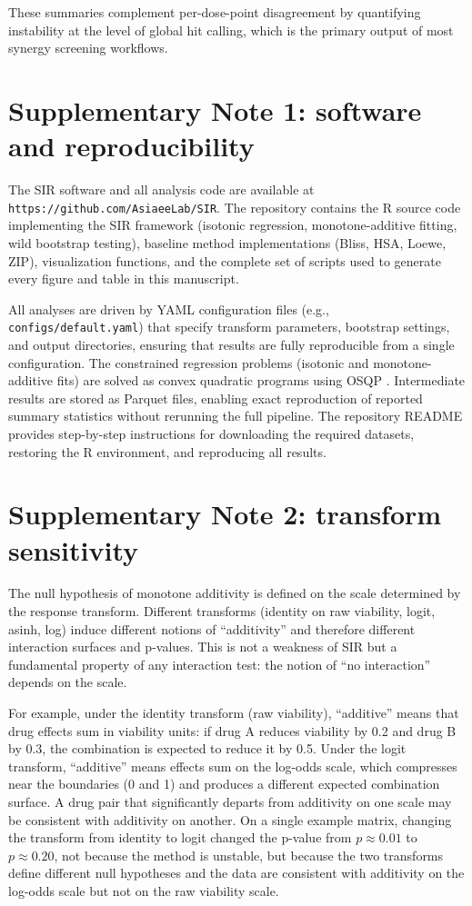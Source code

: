 \documentclass[pdflatex,sn-nature]{sn-jnl}%
\begin{document}
These summaries complement per-dose-point disagreement by quantifying instability at the level of global hit calling, which is the primary output of most synergy screening workflows.

\section{Supplementary Note 1: software and reproducibility}

The SIR software and all analysis code are available at \texttt{https://github.com/AsiaeeLab/SIR}.
The repository contains the R source code implementing the SIR framework (isotonic regression, monotone-additive fitting, wild bootstrap testing), baseline method implementations (Bliss, HSA, Loewe, ZIP), visualization functions, and the complete set of scripts used to generate every figure and table in this manuscript.

All analyses are driven by YAML configuration files (e.g., \texttt{configs/default.yaml}) that specify transform parameters, bootstrap settings, and output directories, ensuring that results are fully reproducible from a single configuration.
The constrained regression problems (isotonic and monotone-additive fits) are solved as convex quadratic programs using OSQP \cite{Stellato2020}.
Intermediate results are stored as Parquet files, enabling exact reproduction of reported summary statistics without rerunning the full pipeline.
The repository README provides step-by-step instructions for downloading the required datasets, restoring the R environment, and reproducing all results.

\section{Supplementary Note 2: transform sensitivity}

The null hypothesis of monotone additivity is defined on the scale determined by the response transform.
Different transforms (identity on raw viability, logit, asinh, log) induce different notions of ``additivity'' and therefore different interaction surfaces and p-values.
This is not a weakness of SIR but a fundamental property of any interaction test: the notion of ``no interaction'' depends on the scale.

For example, under the identity transform (raw viability), ``additive'' means that drug effects sum in viability units: if drug A reduces viability by 0.2 and drug B by 0.3, the combination is expected to reduce it by 0.5.
Under the logit transform, ``additive'' means effects sum on the log-odds scale, which compresses near the boundaries (0 and 1) and produces a different expected combination surface.
A drug pair that significantly departs from additivity on one scale may be consistent with additivity on another.
On a single example matrix, changing the transform from identity to logit changed the p-value from $p\approx 0.01$ to $p\approx 0.20$, not because the method is unstable, but because the two transforms define different null hypotheses and the data are consistent with additivity on the log-odds scale but not on the raw viability scale.
\end{document}
